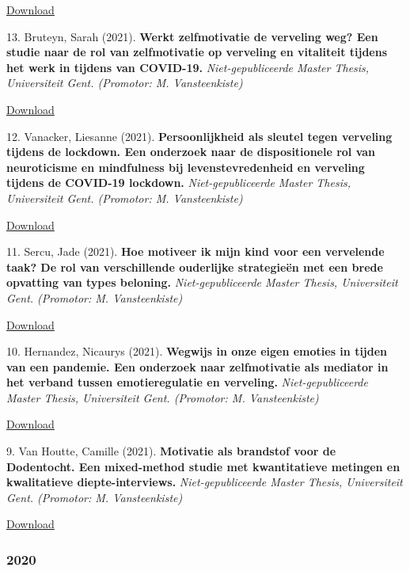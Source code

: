 \documentclass[
]{article}
\begin{document}
\href{download/sciencs/masterproeven/Pede_Sara_Masterproef-II.pdf}{Download
}

13. Bruteyn, Sarah (2021). \textbf{Werkt zelfmotivatie de verveling weg?
Een studie naar de rol van zelfmotivatie op verveling en vitaliteit
tijdens het werk in tijdens van COVID-19.} \emph{Niet-gepubliceerde
Master Thesis, Universiteit Gent. (Promotor: M. Vansteenkiste)}

\href{download/sciencs/masterproeven/Masterproef\%202_Werkt\%20zelfmotivatie\%20de\%20verveling\%20weg.pdf}{Download
}

12. Vanacker, Liesanne (2021). \textbf{Persoonlijkheid als sleutel tegen
verveling tijdens de lockdown. Een onderzoek naar de dispositionele rol
van neuroticisme en mindfulness bij levenstevredenheid en verveling
tijdens de COVID-19 lockdown.} \emph{Niet-gepubliceerde Master Thesis,
Universiteit Gent. (Promotor: M. Vansteenkiste)}

\href{download/sciencs/masterproeven/MasterproefII_LiesanneVanacker_01504522.pdf}{Download
}

11. Sercu, Jade (2021). \textbf{Hoe motiveer ik mijn kind voor een
vervelende taak? De rol van verschillende ouderlijke strategieën met een
brede opvatting van types beloning.} \emph{Niet-gepubliceerde Master
Thesis, Universiteit Gent. (Promotor: M. Vansteenkiste)}

\href{download/sciencs/masterproeven/masterproef\%202\%20Sercu\%20Jade\%2001501290\%20.pdf}{Download
}

10. Hernandez, Nicaurys (2021). \textbf{Wegwijs in onze eigen emoties in
tijden van een pandemie. Een onderzoek naar zelfmotivatie als mediator
in het verband tussen emotieregulatie en verveling.}
\emph{Niet-gepubliceerde Master Thesis, Universiteit Gent. (Promotor: M.
Vansteenkiste)}

\href{download/sciencs/masterproeven/Nicaurys_Hernandez_Masterproef_ll_Eerste_Zit_01713091-geconverteerd\%20(1).pdf}{Download
}

9. Van Houtte, Camille (2021). \textbf{Motivatie als brandstof voor de
Dodentocht. Een mixed-method studie met kwantitatieve metingen en
kwalitatieve diepte-interviews.} \emph{Niet-gepubliceerde Master Thesis,
Universiteit Gent. (Promotor: M. Vansteenkiste)}

\href{download/sciencs/masterproeven/MasterproefII_CamilleVanHoutte_01405482.pdf}{Download
}

\hypertarget{section-8}{%
\subsubsection{2020}\label{section-8}}
\end{document}
